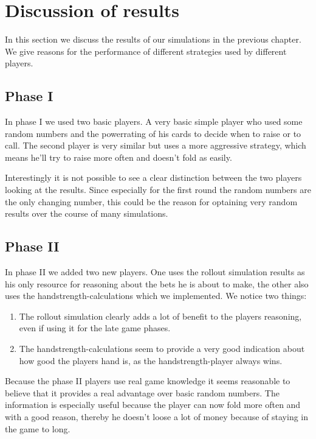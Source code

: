\pagebreak[9]
\section{Discussion of results}
In this section we discuss the results of our simulations in the previous chapter. We give reasons for the performance
of different strategies used by different players.
\subsection{Phase I}
In phase I we used two basic players.
A very basic simple player who used some random numbers and the powerrating of his cards to decide when to raise or to
call. The second player is very similar but uses a more aggressive strategy, which means he'll try to raise more often
and doesn't fold as easily.

Interestingly it is not possible to see a
clear distinction between the two players looking at the results. Since especially for the first round the random
numbers are the only changing number, this could be the reason for optaining very  random results over the course of many
simulations.

\subsection{Phase II}
In phase II we added two new players. One uses the rollout simulation results as his only resource for reasoning about
the bets he is about to make, the other also uses the handstrength-calculations which we implemented. We notice two
things:
\begin{enumerate}
\item The rollout simulation clearly adds a lot of benefit to the players reasoning, even if using it for the late game
phases.
\item The handstrength-calculations seem to provide a very good indication about how good the players hand is, as the
handstrength-player always wins.
\end{enumerate}

Because the phase II players use real game knowledge it seems reasonable to believe that it provides a real advantage
over basic random numbers. The information is especially useful because the player can now fold more often and with a
good reason, thereby he doesn't loose a lot of money because of staying in the game to long.


